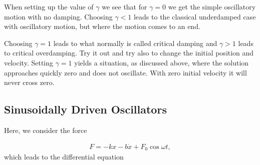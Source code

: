 \documentclass[letterpaper,10pt,english]{sphinxmanual}
\begin{document}
\begin{sphinxVerbatim}[commandchars=\\\{\}]
   
 
\end{sphinxVerbatim}

\noindent{}

When setting up the value of \(\gamma\) we see that for \(\gamma=0\) we get the simple oscillatory motion with no damping.
Choosing \(\gamma < 1\) leads to the classical underdamped case with oscillatory motion, but where the motion comes to an end.

Choosing \(\gamma =1\) leads to what normally is called critical damping and \(\gamma> 1\) leads to critical overdamping.
Try it out and try also to change the initial position and velocity. Setting \(\gamma=1\)
yields a situation, as discussed above, where the solution approaches quickly zero and does not oscillate. With zero initial velocity it will never cross zero.


\subsection{Sinusoidally Driven Oscillators}
\label{\detokenize{chapter4:sinusoidally-driven-oscillators}}
Here, we consider the force




\begin{equation*}
\begin{split}
\begin{equation}
F=-kx-b\dot{x}+F_0\cos\omega t,
\label{_auto8} \tag{11}
\end{equation}
\end{split}
\end{equation*}
which leads to the differential equation
\end{document}
